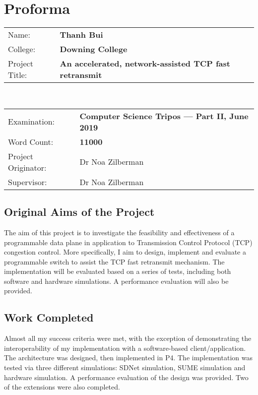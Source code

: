 \chapter*{Proforma}

{\large
\begin{tabular}{ l@{\hskip 3.25em} p{11cm}}
	Name:               & \bf Thanh Bui \\
	College:            & \bf Downing College \\
	Project Title:      & \bf An accelerated, network-assisted TCP fast retransmit \\
\end{tabular}
}
\\
{\large
\begin{tabular}{ l p{11.5cm}}
	Examination:        & \bf Computer Science Tripos --- Part II, June 2019  \\
	Word Count:         & \bf 11000\footnotemark	 \\
	Project Originator: & Dr Noa Zilberman               \\
	Supervisor:         & Dr Noa Zilberman             		\\ 
\end{tabular}
}

\section*{Original Aims of the Project}
The aim of this project is to investigate the feasibility and effectiveness of a programmable data plane in application to Transmission Control Protocol (TCP) congestion control. More specifically, I aim to design, implement and evaluate a programmable switch to assist the TCP fast retransmit mechanism. The implementation will be evaluated based on a series of tests, including both software and hardware simulations. A performance evaluation will also be provided.  

\section*{Work Completed}
Almost all my success criteria were met, with the exception of demonstrating the interoperability of my implementation with a software-based client/application. The architecture was designed, then implemented in P4. The implementation was tested via three different simulations: SDNet simulation, SUME simulation and hardware simulation. A performance evaluation of the design was provided. Two of the extensions were also completed. 

